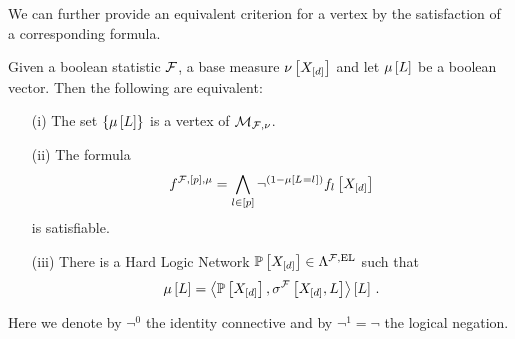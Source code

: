 We can further provide an equivalent criterion for a vertex by the satisfaction of a corresponding formula.

\begin{theorem}
    Given a boolean statistic $\mathcal{F}$, a base measure $\nu\left[X_{[d]}\right]$ and let $\mu\left[L\right]$ be a boolean vector.
    Then the following are equivalent:
    \begin{itemize}
        \item[(i)] The set $\{\mu\left[L\right]\}$ is a vertex of $\mathcal{M}_{\mathcal{F},\nu}$.
        \item[(ii)] The formula
        \begin{align*}
            f^{\mathcal{F},[p],\mu} = \bigwedge_{l\in[p]} \lnot^{(1-\mu\left[L_{}=l_{}\right])} f_{l}\left[X_{[d]}\right]
        \end{align*}
        is satisfiable.
        \item[(iii)] There is a Hard Logic Network $\mathbb{P}\left[X_{[d]}\right]\in\Lambda^{\mathcal{F},\mathrm{EL}}$ such that
        \begin{align*}
            \mu\left[L\right] = \left\langle \mathbb{P}\left[X_{[d]}\right],\sigma^{\mathcal{F}}\left[X_{[d]},L\right]\right\rangle \left[ L \right] \, .
        \end{align*}
    \end{itemize}
    Here we denote by $\lnot^0$ the identity connective and by $\lnot^1=\lnot$ the logical negation.
\end{theorem}
